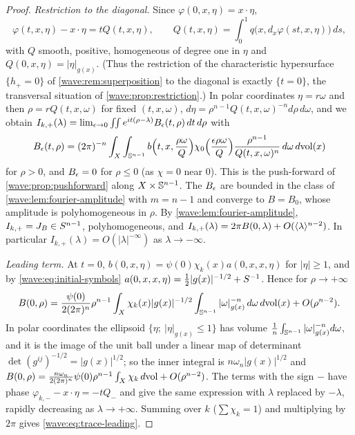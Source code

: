 \begin{proof}
\emph{Restriction to the diagonal.} Since $\varphi(0,x,\eta)=x\cdot\eta$,
\begin{equation*}
\varphi(t,x,\eta)-x\cdot\eta=tQ(t,x,\eta),\qquad Q(t,x,\eta)=\int_0^1q\big(x,d_x\varphi(st,x,\eta)\big)\,ds,
\end{equation*}
with $Q$ smooth, positive, homogeneous of degree one in $\eta$ and
$Q(0,x,\eta)=|\eta|_{g(x)}$. (Thus the restriction of the characteristic hypersurface
$\{h_+=0\}$ of \cref{wave:rem:superposition} to the diagonal is exactly $\{t=0\}$, the
transversal situation of \cref{wave:prop:restriction}.) In polar coordinates
$\eta=r\omega$ and then $\rho=rQ(t,x,\omega)$ for fixed $(t,x,\omega)$,
$d\eta=\rho^{n-1}Q(t,x,\omega)^{-n}d\rho\,d\omega$, and we obtain
$I_{k,+}(\lambda)=\lim_{\epsilon\to0}\iint e^{it(\rho-\lambda)}B_\epsilon(t,\rho)\,dt\,d\rho$ with
\begin{equation*}
B_\epsilon(t,\rho)=(2\pi)^{-n}\int_X\int_{\mathbb{S}^{n-1}}b\Big(t,x,\frac{\rho\omega}{Q}\Big)\chi_0\Big(\frac{\epsilon\rho\omega}{Q}\Big)\frac{\rho^{n-1}}{Q(t,x,\omega)^n}\,d\omega\,d\mathrm{vol}(x)
\end{equation*}
for $\rho>0$, and $B_\epsilon=0$ for $\rho\le0$ (as $\chi=0$ near $0$). This is the
push-forward of \cref{wave:prop:pushforward} along $X\times\mathbb{S}^{n-1}$. The
$B_\epsilon$ are bounded in the class of \cref{wave:lem:fourier-amplitude} with $m=n-1$ and
converge to $B=B_0$, whose amplitude is polyhomogeneous in $\rho$. By
\cref{wave:lem:fourier-amplitude}, $I_{k,+}=J_B\in S^{n-1}$, polyhomogeneous, and
$I_{k,+}(\lambda)=2\pi B(0,\lambda)+O(\langle \lambda\rangle^{n-2})$. In particular $I_{k,+}(\lambda)=O(|\lambda|^{-\infty})$
as $\lambda\to-\infty$.

\emph{Leading term.} At $t=0$, $b(0,x,\eta)=\psi(0)\chi_k(x)a(0,x,x,\eta)$ for $|\eta|\ge1$, and by
\eqref{wave:eq:initial-symbols} $a(0,x,x,\eta)=\frac12|g(x)|^{-1/2}+S^{-1}$. Hence for
$\rho\to+\infty$
\begin{equation*}
B(0,\rho)=\frac{\psi(0)}{2(2\pi)^n}\rho^{n-1}\int_X\chi_k(x)|g(x)|^{-1/2}\int_{\mathbb{S}^{n-1}}|\omega|_{g(x)}^{-n}\,d\omega\,d\mathrm{vol}(x)+O(\rho^{n-2}).
\end{equation*}
In polar coordinates the ellipsoid $\{\eta;\ |\eta|_{g(x)}\le1\}$ has volume
$\frac1n\int_{\mathbb{S}^{n-1}}|\omega|_{g(x)}^{-n}d\omega$, and it is the image of the unit ball under a linear
map of determinant $\det(g^{ij})^{-1/2}=|g(x)|^{1/2}$; so the inner integral is $n\omega_n|g(x)|^{1/2}$ and
$B(0,\rho)=\frac{n\omega_n}{2(2\pi)^n}\psi(0)\rho^{n-1}\int_X\chi_k\,d\mathrm{vol}+O(\rho^{n-2})$. The terms with the sign
$-$ have phase $\varphi_{k,-}-x\cdot\eta=-tQ_-$ and give the same expression with $\lambda$ replaced by
$-\lambda$, rapidly decreasing as $\lambda\to+\infty$. Summing over $k$ ($\sum\chi_k=1$) and
multiplying by $2\pi$ gives \eqref{wave:eq:trace-leading}.
\end{proof}

